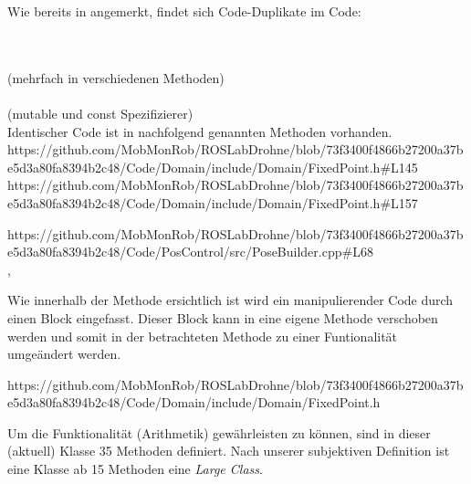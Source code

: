 







Wie bereits in  angemerkt, findet sich Code-Duplikate im Code:

\zB\\
\\
 (mehrfach in verschiedenen Methoden)\\
\zB\\
 (mutable und const Spezifizierer)\\
Identischer Code ist in nachfolgend genannten Methoden vorhanden.\\
https://github.com/MobMonRob/ROSLabDrohne/blob/73f3400f4866b27200a37be5d3a80fa8394b2c48/Code/Domain/include/Domain/FixedPoint.h\#L145
https://github.com/MobMonRob/ROSLabDrohne/blob/73f3400f4866b27200a37be5d3a80fa8394b2c48/Code/Domain/include/Domain/FixedPoint.h\#L157


https://github.com/MobMonRob/ROSLabDrohne/blob/73f3400f4866b27200a37be5d3a80fa8394b2c48/Code/PosControl/src/PoseBuilder.cpp\#L68
\\
, 

Wie innerhalb der Methode ersichtlich ist wird ein manipulierender Code durch einen Block eingefasst. Dieser Block kann in eine eigene Methode verschoben werden und somit in der betrachteten Methode zu einer Funtionalität umgeändert werden.




https://github.com/MobMonRob/ROSLabDrohne/blob/73f3400f4866b27200a37be5d3a80fa8394b2c48/Code/Domain/include/Domain/FixedPoint.h
\\

Um die Funktionalität (Arithmetik) gewährleisten zu können, sind in dieser (aktuell) Klasse 35 Methoden definiert.
Nach unserer subjektiven Definition ist eine Klasse ab 15 Methoden eine \textit{Large Class}.



